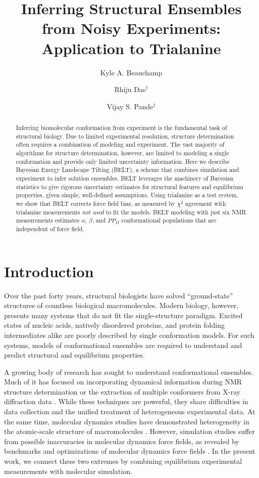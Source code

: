 \documentclass[journal=jacsat,manuscript=article]{achemso}
\author{Kyle A. Beauchamp}
\affiliation[Biophysics Program]{Biophysics Program}
\author{Rhiju Das$^\dagger$}
\affiliation[Biochemistry Department]{Biochemistry Department, Stanford University, Stanford, CA}
\author{Vijay S. Pande$^\dagger$}
\affiliation[Chemistry Department]{Chemistry Department, Stanford University, Stanford, CA}
\title{Inferring Structural Ensembles from Noisy Experiments: Application to Trialanine}
\begin{document}
\maketitle

\begin{abstract}

Inferring biomolecular conformation from experiment is the fundamental task of structural biology.  Due to limited experimental resolution, structure determination often requires a combination of modeling and experiment.  The vast majority of algorithms for structure determination, however, are limited to modeling a single conformation and provide only limited uncertainty information.  Here we describe Bayesian Energy Landscape Tilting (BELT), a scheme that combines simulation and experiment to infer solution ensembles.  BELT leverages the machinery of Bayesian statistics to give rigorous uncertainty estimates for structural features and equilibrium properties, given simple, well-defined assumptions.  Using trialanine as a test system, we show that BELT corrects force field bias, as measured by $\chi^2$ agreement with trialanine measurements \emph{not used} to fit the models.  BELT modeling with just six NMR measurements estimates $\alpha$, $\beta$, and $PP_{II}$ conformational populations that are 
independent of force field.  

\end{abstract}

\section{Introduction}

Over the past forty years, structural biologists have solved ``ground-state'' structures of countless biological macromolecules\cite{Berman2000}. Modern biology, however, presents many systems that do not fit the single-structure paradigm.  Excited states of nucleic acids\cite{dethoff2012}, natively disordered proteins\cite{fink2005}, and protein folding intermediates\cite{korzhnev2004} alike are poorly described by single conformation models.  For such systems, models of conformational ensembles are required to understand and predict structural and equilibrium properties.  

A growing body of research has sought to understand conformational ensembles.  Much of it has focused on incorporating dynamical information during NMR structure determination \cite{lindorff2005simultaneous, lange2008recognition} or the extraction of multiple conformers from X-ray diffraction data \cite{depristo2004heterogeneity, lang2010automated}.  While these techniques are powerful, they share difficulties in data collection and the unified treatment of heterogeneous experimental data.  At the same time, molecular dynamics studies have demonstrated heterogeneity in the atomic-scale structure of macromolecules \cite{shaw2010}.   However, simulation studies suffer from possible inaccuracies in molecular dynamics force fields, as revealed by benchmarks and optimizations of molecular dynamics force fields \cite{li2011iterative, best2012optimization, lindorff2012systematic}.  In the present work, we connect these two extremes by combining equilibrium experimental measurements with molecular simulation.  
\end{document}
